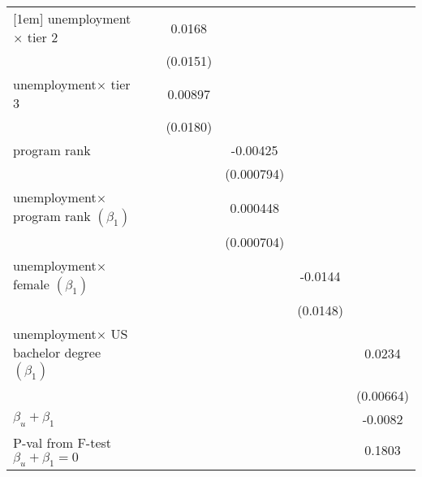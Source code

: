 \begin{table}[htbp]
\begin{adjustbox}{max width=0.68\textwidth}
\begin{tabular}{l*{5}{c}}
[1em]
unemployment$\times$ tier 2  &                     &      0.0168         &                     &                     &                     \\
                    &                     &    (0.0151)         &                     &                     &                     \\
[1em]
unemployment$\times$ tier 3   &                     &     0.00897         &                     &                     &                     \\
                    &                     &    (0.0180)         &                     &                     &                     \\
[1em]
program rank               &                     &                     &    -0.00425\sym{***}&                     &                     \\
                    &                     &                     &  (0.000794)         &                     &                     \\
[1em]
unemployment$\times$ program rank $\left( \beta_1 \right)$  &                     &                     &    0.000448         &                     &                     \\
                    &                     &                     &  (0.000704)         &                     &                     \\
[1em]
unemployment$\times$ female $\left( \beta_1 \right)$ &                     &                     &                     &     -0.0144         &                     \\
                    &                     &                     &                     &    (0.0148)         &                     \\
[1em]
unemployment$\times$ US bachelor degree $\left( \beta_1 \right)$&                     &                     &                     &                     &      0.0234\sym{***}\\
                    &                     &                     &                     &                     &   (0.00664)         \\
\hline
$\beta_u + \beta_1  $ &                 &                &                 &          &  -0.0082  \\
P-val from F-test $\beta_u + \beta_1 =0 $  &                 &              &                 &              &  0.1803  \\

\end{tabular}
\end{adjustbox}
\end{table}
